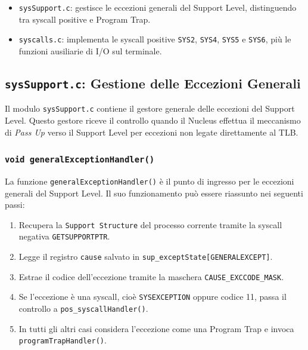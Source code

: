 \documentclass[a4paper,12pt]{article}
\begin{document}
\begin{enumerate}
\begin{itemize}
    \item \texttt{sysSupport.c}: gestisce le eccezioni generali del Support Level, distinguendo tra syscall positive e Program Trap.
     \item \texttt{syscalls.c}: implementa le syscall positive \texttt{SYS2},
          \texttt{SYS4}, \texttt{SYS5} e \texttt{SYS6}, più le funzioni ausiliarie
          di I/O sul terminale.
\end{itemize}

\vspace{0.5cm}
\subsection{\texttt{sysSupport.c}: Gestione delle Eccezioni Generali}

Il modulo \texttt{sysSupport.c} contiene il gestore generale delle eccezioni del Support Level. Questo gestore riceve il controllo quando il Nucleus effettua il meccanismo di \textit{Pass Up} verso il Support Level per eccezioni non legate direttamente al TLB.

\vspace{0.3cm}
\subsubsection{\texttt{void generalExceptionHandler()}}

La funzione \texttt{generalExceptionHandler()} è il punto di ingresso per le eccezioni generali del Support Level. Il suo funzionamento può essere riassunto nei seguenti passi:

\begin{enumerate}
    \item Recupera la \texttt{Support Structure} del processo corrente tramite la syscall negativa \texttt{GETSUPPORTPTR}.
    \item Legge il registro \texttt{cause} salvato in \texttt{sup\_exceptState[GENERALEXCEPT]}.
    \item Estrae il codice dell'eccezione tramite la maschera \texttt{CAUSE\_EXCCODE\_MASK}.
    \item Se l'eccezione è una syscall, cioè \texttt{SYSEXCEPTION} oppure codice 11, passa il controllo a \texttt{pos\_syscallHandler()}.
    \item In tutti gli altri casi considera l'eccezione come una Program Trap e invoca \texttt{programTrapHandler()}.
\end{enumerate}


\end{enumerate}
\end{document}
